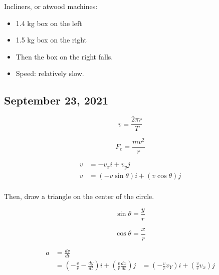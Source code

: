 \documentclass{scrreprt} %
\begin{document}
Incliners, or atwood machines:

\begin{itemize}
	\item 1.4 kg box on the left
	\item 1.5 kg box on the right
	\item Then the box on the right falls.
	\item Speed: relatively slow.
\end{itemize}

\subsection{September 23, 2021}

\begin{theorem}
	$$v = \frac{2\pi r}{T}$$
\end{theorem}

\begin{theorem}

$$F_c = \frac{mv^2}{r}$$

\begin{align*}
	v &= -v_xi + v_yj \\ 
	v &= (-v\sin \theta)i + (v\cos \theta)j \\
\end{align*}

Then, draw a triangle on the center of the circle.

$$\sin \theta = \frac{y}{r}$$

$$\cos \theta = \frac{x}{r}$$

\begin{align*}
	a &= \frac{dv}{dt} \\
	  &= (-\frac{v}{r} - \frac{dy}{dt})i + (\frac{v}{r} \frac{dx}{dt})j
	  &= (-\frac{v}{r}v_Y)i + (\frac{v}{r}v_x)j
\end{align*}
	
\end{theorem}
\end{document}
